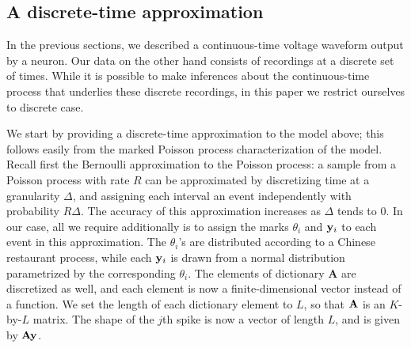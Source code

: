 
\subsection{A discrete-time approximation}
In the previous sections, we described a continuous-time voltage waveform output by a neuron. Our data on the other hand consists of recordings
at a discrete set of times. While it is possible to make inferences about the continuous-time process that underlies these discrete recordings,
in this paper we restrict ourselves to discrete case. 

We start by providing a discrete-time approximation to the model above; this follows easily from the marked Poisson process characterization of the model.
Recall first the Bernoulli approximation to the Poisson process: a sample from a Poisson process with rate $R$ can be approximated by discretizing
time at a granularity $\Delta$, and assigning each interval an event independently with probability $R\Delta$. The accuracy of this approximation increases 
as $\Delta$ tends to $0$.
%
In our case, all we require additionally is to assign the marks $\theta_i$ and $\mathbf{y}_i$ to each event in this approximation. The $\theta_i$'s are distributed according
to a Chinese restaurant process, while each $\mathbf{y}_i$ is drawn from a normal distribution parametrized by the corresponding $\theta_i$. The elements
of dictionary $\mathbf{A}$ are discretized as well, and each element is now a finite-dimensional vector instead of a function. We set the length of each
dictionary element to $L$, so that $\mathbf{A}$ is an $K$-by-$L$ matrix. The shape of the $j$th spike is now a vector of length $L$, and is given by $\mathbf{A} \mathbf{y}$.

